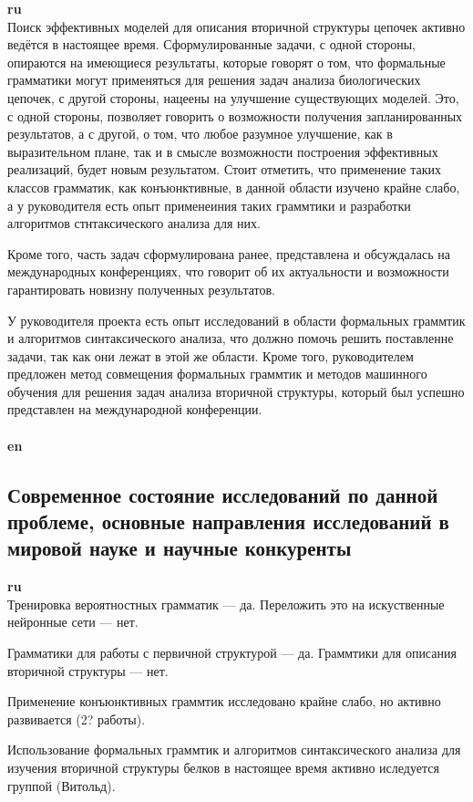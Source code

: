 \documentclass[12pt]{article}  %
\theoremstyle{remark}
\begin{document}
\textbf{ru}\\
Поиск эффективных моделей для описания вторичной структуры цепочек активно ведётся в настоящее время.
Сформулированные задачи, с одной стороны, опираются на имеющиеся результаты, которые говорят о том, что формальные грамматики могут применяться для решения задач анализа биологических цепочек, с другой стороны, нацеены на улучшение существующих моделей.
Это, с одной стороны, позволяет говорить о возможности получения запланированных результатов, а с другой, о том, что любое разумное улучшение, как в выразительном плане, так и в смысле возможности построения эффективных реализаций, будет новым результатом.
Стоит отметить, что применение таких классов грамматик, как конъюнктивные, в данной области изучено крайне слабо, а у руководителя есть опыт применеиния таких граммтики и разработки алгоритмов стнтаксического анализа для них.

Кроме того, часть задач сформулирована ранее, представлена и обсуждалась на международных конференциях, что говорит об их актуальности и возможности гарантировать новизну полученных результатов.

У руководителя проекта есть опыт исследований в области формальных граммтик и алгоритмов синтаксического анализа, что должно помочь решить поставленне задачи, так как они лежат в этой же области.
Кроме того, руководителем предложен метод совмещения формальных граммтик и методов машинного обучения для решения задач анализа вторичной структуры, который был успешно представлен на международной конференции.
\\
\\
\textbf{en}\\


\subsection{Современное состояние исследований по данной проблеме, основные направления исследований в мировой науке и научные конкуренты}

\textbf{ru}\\
Тренировка вероятностных грамматик --- да.
Переложить это на искуственные нейронные сети --- нет.

Грамматики для работы с первичной структурой --- да.
Граммтики для описания вторичной структуры --- нет.

Применение конъюнктивных граммтик исследовано крайне слабо, но активно развивается (2? работы).

Использование формальных граммтик и алгоритмов синтаксического анализа для изучения вторичной структуры белков в настоящее время активно иследуется группой (Витольд).
\end{document}
